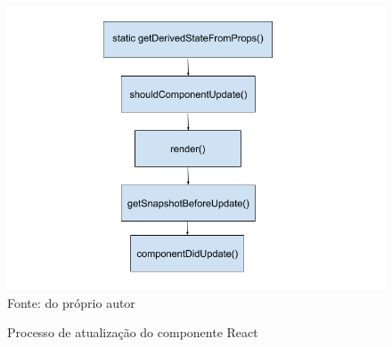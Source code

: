 \begin{figure}[H]
\centering
\caption{Processo de atualização do componente React}
\includegraphics[scale=0.7]{figuras/atualizacao.png}
\label{atualizacao}
\\
\small{Fonte: do próprio autor}
\end{figure}
